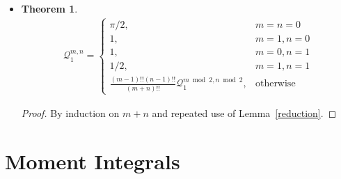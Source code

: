 \documentclass[10pt]{article}
\newtheorem{theorem}[lemma]{Theorem}
\begin{document}
\begin{itemize}
			\item \begin{theorem} \label{q1mn}
				\begin{align*}
					\mathcal{Q}_1^{m,n} = 
						\begin{cases}
							\pi/2, & m = n = 0 \\
							1, & m = 1, n = 0 \\
							1, & m = 0, n = 1 \\
							1/2, & m = 1, n = 1 \\
							\frac{(m-1)!!(n-1)!!}{(m+n)!!} \mathcal{Q}_1^{m \bmod 2, n \bmod 2}, & \mbox{otherwise}
						\end{cases}
				\end{align*}
			\end{theorem}
			\begin{proof}
				By induction on $m+n$ and repeated use of Lemma~\ref{reduction}.
			\end{proof}
		\end{itemize}
	
	\section{Moment Integrals} %
	\label{sec:moment_integrals}
	
\end{document}
